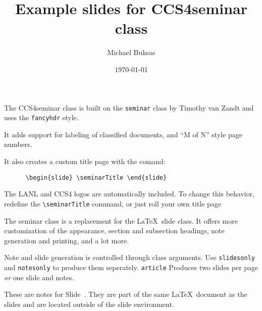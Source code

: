 \documentclass[SRD,
               slidesonly,
                notes
              ]{CCS4seminar}
\title{Example slides for CCS4seminar class}
\author{Michael Buksas}
\date{\today}
\begin{document}
\begin{slide} \seminarTitle \end{slide}

\begin{slide}

  
  The CCS4seminar class is built on the {\tt seminar} class by Timothy
  van Zandt and uses the {\tt fancyhdr} style.
  
  It adds support for labeling of classified documents, and ``M of N''
  style page numbers.

  It also creates a custom title page with the comand:
  \begin{verbatim}
      \begin{slide} \seminarTitle \end{slide}
  \end{verbatim}
  The LANL and CCS4 logos are automatically included. To change this
  behavior, redefine the \verb=\seminarTitle= command, or just roll
  your own title page

\end{slide}

\begin{slide}


  The seminar class is a replacement for the \LaTeX\ slide class. It
  offers more customization of the appearance, section and subsection
  headings, note generation and printing, and a lot more.
  
   \label{slide:notes}
  
  Note and slide generation is controlled through class arguments. Use
  {\tt slidesonly} and {\tt notesonly} to produce them seperately.
  {\tt article} Produces two slides per page {\em or} one slide and
  notes.

\end{slide}

These are notes for Slide~\pageref{slide:notes}. They are part of the
same \LaTeX\ document as the slides and are located outside of the
slide environment.
\end{document}
